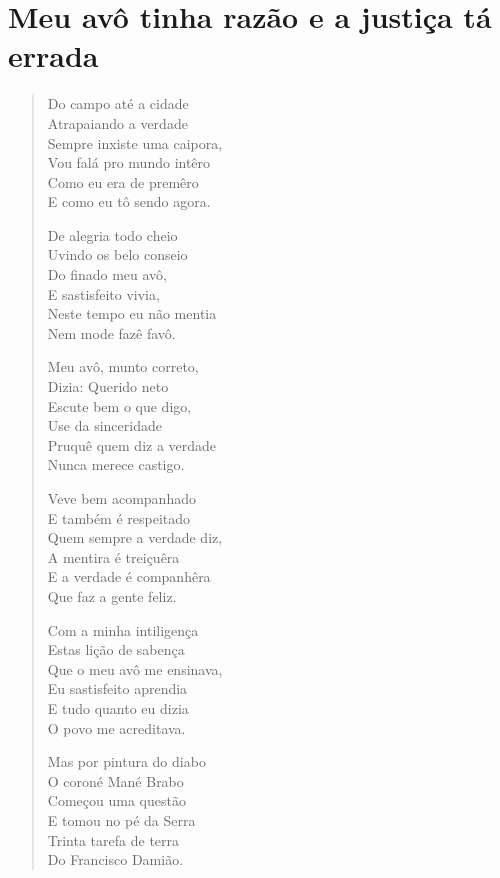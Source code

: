 \chapter{Meu avô tinha razão e a justiça tá errada}

\begin{verse}
Do campo até a cidade\\
Atrapaiando a verdade\\
Sempre inxiste uma caipora,\\
Vou falá pro mundo intêro\\
Como eu era de premêro\\
E como eu tô sendo agora.

De alegria todo cheio\\
Uvindo os belo conseio\\
Do finado meu avô,\\
E sastisfeito vivia,\\
Neste tempo eu não mentia\\
Nem mode fazê favô.

Meu avô, munto correto,\\
Dizia: Querido neto\\
Escute bem o que digo,\\
Use da sinceridade\\
Pruquê quem diz a verdade\\
Nunca merece castigo.

Veve bem acompanhado\\
E também é respeitado\\
Quem sempre a verdade diz,\\
A mentira é treiçuêra\\
E a verdade é companhêra\\
Que faz a gente feliz.

Com a minha intiligença\\
Estas lição de sabença\\
Que o meu avô me ensinava,\\
Eu sastisfeito aprendia\\
E tudo quanto eu dizia\\
O povo me acreditava.

Mas por pintura do diabo\\
O coroné Mané Brabo\\
Começou uma questão\\
E tomou no pé da Serra\\
Trinta tarefa de terra\\
Do Francisco Damião.


\end{verse}
